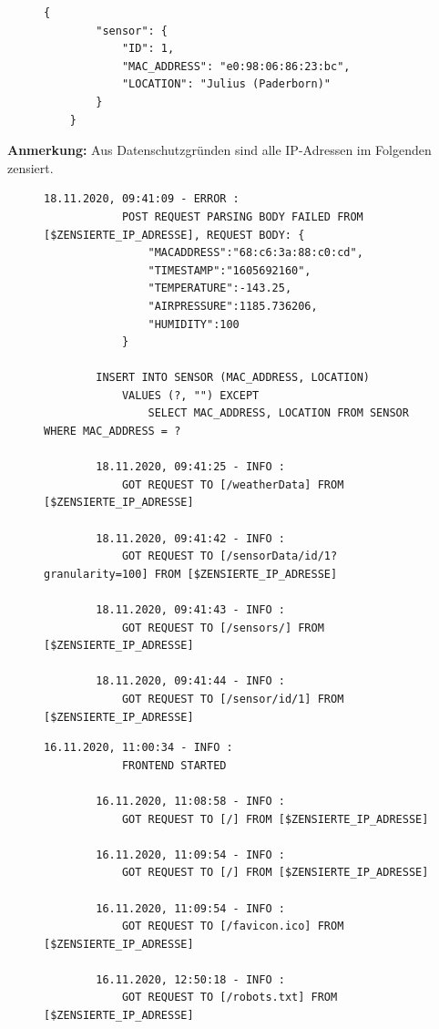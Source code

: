 \begin{figure}[bht]
    \begin{lstlisting}[caption=Antwort GET-Request /sensor/id/1, label=list:getSensor]
	{
		"sensor": {
			"ID": 1,
			"MAC_ADDRESS": "e0:98:06:86:23:bc",
			"LOCATION": "Julius (Paderborn)"
		}
	}
    \end{lstlisting}
\end{figure}

\pagebreak

\label{anhang:logdaten}
\textbf{Anmerkung:} Aus Datenschutzgründen sind alle IP-Adressen im Folgenden zensiert.
\begin{figure}[bht]
    \begin{lstlisting}[caption=Beispielhafter Logauszug Backend, label=list:logBackend]
		18.11.2020, 09:41:09 - ERROR :
			POST REQUEST PARSING BODY FAILED FROM [$ZENSIERTE_IP_ADRESSE], REQUEST BODY: {
				"MACADDRESS":"68:c6:3a:88:c0:cd",
				"TIMESTAMP":"1605692160",
				"TEMPERATURE":-143.25,
				"AIRPRESSURE":1185.736206,
				"HUMIDITY":100
			}

		INSERT INTO SENSOR (MAC_ADDRESS, LOCATION)
			VALUES (?, "") EXCEPT
				SELECT MAC_ADDRESS, LOCATION FROM SENSOR WHERE MAC_ADDRESS = ?

		18.11.2020, 09:41:25 - INFO :
			GOT REQUEST TO [/weatherData] FROM [$ZENSIERTE_IP_ADRESSE]

		18.11.2020, 09:41:42 - INFO :
			GOT REQUEST TO [/sensorData/id/1?granularity=100] FROM [$ZENSIERTE_IP_ADRESSE]

		18.11.2020, 09:41:43 - INFO :
			GOT REQUEST TO [/sensors/] FROM [$ZENSIERTE_IP_ADRESSE]

		18.11.2020, 09:41:44 - INFO :
			GOT REQUEST TO [/sensor/id/1] FROM [$ZENSIERTE_IP_ADRESSE]
    \end{lstlisting}
\end{figure}

\begin{figure}[bht]
    \begin{lstlisting}[caption=Beispielhafter Logauszug Frontend, label=list:logFrontend]
		16.11.2020, 11:00:34 - INFO :
			FRONTEND STARTED

		16.11.2020, 11:08:58 - INFO :
			GOT REQUEST TO [/] FROM [$ZENSIERTE_IP_ADRESSE]

		16.11.2020, 11:09:54 - INFO :
			GOT REQUEST TO [/] FROM [$ZENSIERTE_IP_ADRESSE]

		16.11.2020, 11:09:54 - INFO :
			GOT REQUEST TO [/favicon.ico] FROM [$ZENSIERTE_IP_ADRESSE]

		16.11.2020, 12:50:18 - INFO :
			GOT REQUEST TO [/robots.txt] FROM [$ZENSIERTE_IP_ADRESSE]
    \end{lstlisting}
\end{figure}

